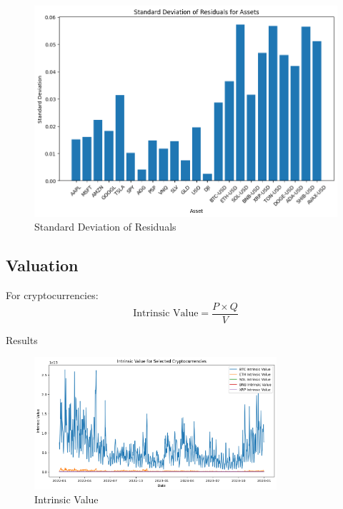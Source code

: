 \begin{figure}
    \centering
    \includegraphics[width=\textwidth]{code/volatility-analysis/garch-with-mulit-assets/standard_deviation.png}
    \caption{Standard Deviation of Residuals}
    \label{fig:exp_return}
\end{figure}



\subsection{Valuation}

For cryptocurrencies:
\[
\text{Intrinsic Value} = \frac{P \times Q}{V}
\]

Results

\begin{figure}
    \centering
    \includegraphics[width=0.8\textwidth]{./code/valuation-techniques/intrinsic_value.png}
    \caption{Intrinsic Value }
    \label{fig:beta}
\end{figure}

